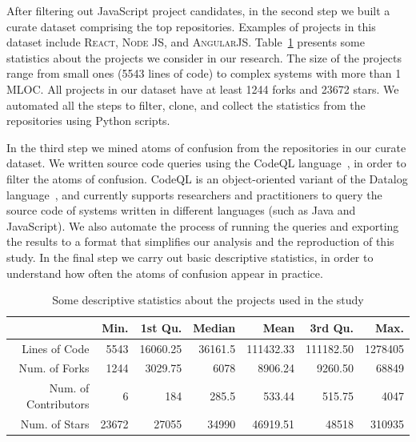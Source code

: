 After filtering out JavaScript project candidates, in the second step we built a curate dataset comprising the top \minedprojects repositories. Examples of projects in this dataset include \textsc{React}, \textsc{Node JS}, and \textsc{AngularJS}. Table~\ref{tab:projects-statistics} presents some statistics about the projects we consider in our research. The size of the projects range from small ones (5543 lines of code) to complex systems with more than 1 MLOC. All projects in our dataset have at least \num{1244} forks and \num{23672} stars. We automated all the steps to filter, clone, and collect the statistics from the repositories using Python scripts.

In the third step we mined atoms of confusion from the repositories in our curate dataset. We written source code queries using the CodeQL language~\cite{moor:gttse2007}, in order to filter the atoms of confusion. CodeQL is an object-oriented variant of the Datalog language~\cite{rodriguez2020efficient}, and currently supports researchers and practitioners to query the source code of systems written in different languages (such as Java and JavaScript). 
We also automate the process of running the queries and exporting the results to a format that simplifies our analysis and the reproduction of this study. In the final step we carry out basic descriptive statistics, in order to understand how often the atoms of confusion appear in practice. 

\begin{table}[ht]
 \centering
 \begin{tabular}{rrrrrrr}
   \hline
             & Min. & 1st Qu. & Median & Mean & 3rd Qu. & Max. \\ \hline
 Lines of Code           & \num{5543}  & \num{16060.25} & \num{36161.5} & \num{111432.33} & \num{111182.50} & \num{1278405} \\
 Num. of Forks     & \num{1244}   & \num{3029.75} & \num{6078} & \num{8906.24} & \num{9260.50} & \num{68849} \\
 Num. of Contributors  & \num{6}   & \num{184} & \num{285.5} & \num{533.44} & \num{515.75} & \num{4047} \\
 Num. of Stars        & \num{23672} & \num{27055} & \num{34990} & \num{46919.51} & \num{48518} & \num{310935} \\
 
    \hline
 \end{tabular}
 \caption{Some descriptive statistics about the projects used in the study}
 \label{tab:projects-statistics} 
 \end{table}
 
